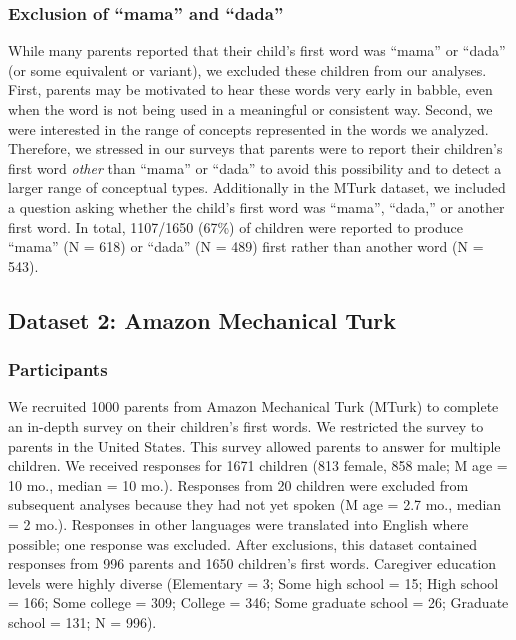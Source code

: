 \documentclass[10pt,letterpaper]{article}
\begin{document}
\subsubsection{Exclusion of ``mama'' and ``dada''}

While many parents reported that their child's first word was ``mama'' or ``dada'' (or some equivalent or variant), we excluded these children from our analyses. First, parents may be motivated to hear these words very early in babble, even when the word is not being used in a meaningful or consistent way. Second, we were interested in the range of concepts represented in the words we analyzed. Therefore, we stressed in our surveys that parents were to report their children's first word \emph{other} than ``mama'' or ``dada'' to avoid this possibility and to detect a larger range of conceptual types. Additionally in the MTurk dataset, we included a question asking whether the child's first word was ``mama'', ``dada,'' or another first word. In total, 1107/1650 (67\%) of children were reported to produce ``mama'' (N = 618) or ``dada'' (N = 489) first rather than another word (N = 543).
\vspace{-.2em}
\subsection{Dataset 2: Amazon Mechanical Turk}

\subsubsection{Participants}

We recruited 1000 parents from Amazon Mechanical Turk (MTurk) to complete an in-depth survey on their children's first words. We restricted the survey to parents in the United States. This survey allowed parents to answer for multiple children. We received responses for 1671 children (813 female, 858 male; M age = 10 mo., median = 10 mo.). Responses from 20 children were excluded from subsequent analyses because they had not yet spoken (M age = 2.7 mo., median = 2 mo.). Responses in other languages were translated into English where possible; one response was excluded. After exclusions, this dataset contained responses from 996 parents and 1650 children's first words. Caregiver education levels were highly diverse (Elementary = 3; Some high school = 15; High school = 166; Some college = 309; College = 346; Some graduate school = 26; Graduate school = 131; N = 996).
\end{document}
